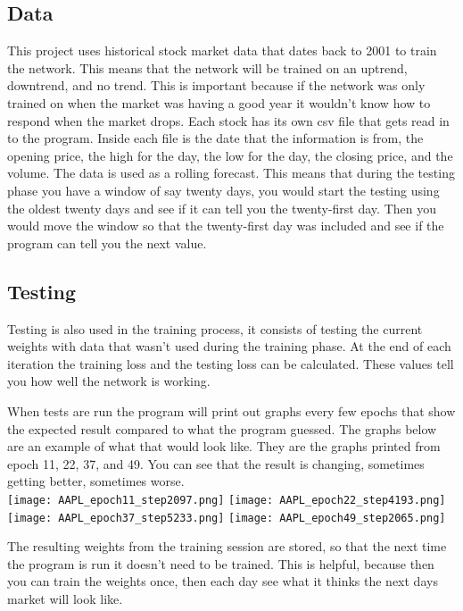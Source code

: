 \documentclass{article}
\begin{document}
\subsection{Data}
This project uses historical stock market data that dates back to 2001 to train the network. This means that the network will be trained on an uptrend, downtrend, and no trend.
This is important because if the network was only trained on when the market was having a good year it wouldn't know how to respond when the market drops.
Each stock has its own csv file that gets read in to the program.
Inside each file is the date that the information is from, the opening price, the high for the day, the low for the day, the closing price, and the volume.
The data is used as a rolling forecast.
This means that during the testing phase you have a window of say twenty days, you would start the testing using the oldest twenty days and see if it can tell you the twenty-first day.
Then you would move the window so that the twenty-first day was included and see if the program can tell you the next value.

\subsection{Testing}
Testing is also used in the training process, it consists of testing the current weights with data that wasn't used during the training phase. 
At the end of each iteration the training loss and the testing loss can be calculated.
These values tell you how well the network is working.

When tests are run the program will print out graphs every few epochs that show the expected result compared to what the program guessed. 
The graphs below are an example of what that would look like.
They are the graphs printed from epoch 11, 22, 37, and 49.
You can see that the result is changing, sometimes getting better, sometimes worse.\\	

\texttt{[image: AAPL\_epoch11\_step2097.png]}
\texttt{[image: AAPL\_epoch22\_step4193.png]}\\


\texttt{[image: AAPL\_epoch37\_step5233.png]}
\texttt{[image: AAPL\_epoch49\_step2065.png]}

The resulting weights from the training session are stored, so that the next time the program is run it doesn't need to be trained.
This is helpful, because then you can train the weights once, then each day see what it thinks the next days market will look like.
\end{document}
